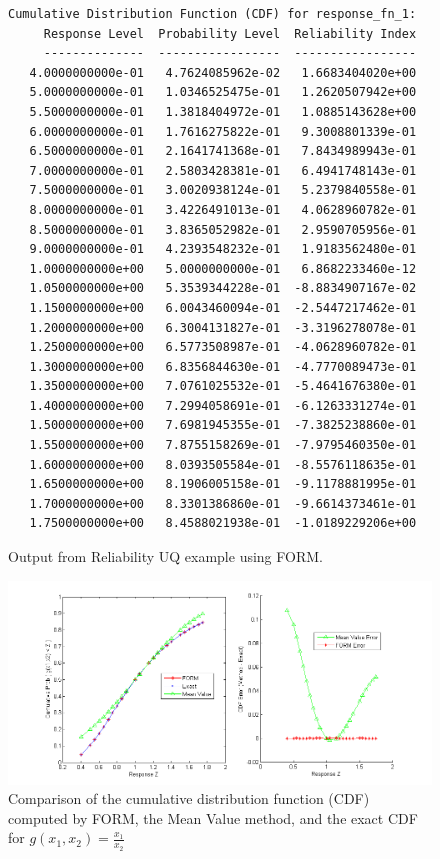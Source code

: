 \begin{figure}
\centering
\begin{bigbox}
\begin{small}
\begin{verbatim}
Cumulative Distribution Function (CDF) for response_fn_1:
     Response Level  Probability Level  Reliability Index
     --------------  -----------------  -----------------
   4.0000000000e-01   4.7624085962e-02   1.6683404020e+00
   5.0000000000e-01   1.0346525475e-01   1.2620507942e+00
   5.5000000000e-01   1.3818404972e-01   1.0885143628e+00
   6.0000000000e-01   1.7616275822e-01   9.3008801339e-01
   6.5000000000e-01   2.1641741368e-01   7.8434989943e-01
   7.0000000000e-01   2.5803428381e-01   6.4941748143e-01
   7.5000000000e-01   3.0020938124e-01   5.2379840558e-01
   8.0000000000e-01   3.4226491013e-01   4.0628960782e-01
   8.5000000000e-01   3.8365052982e-01   2.9590705956e-01
   9.0000000000e-01   4.2393548232e-01   1.9183562480e-01
   1.0000000000e+00   5.0000000000e-01   6.8682233460e-12
   1.0500000000e+00   5.3539344228e-01  -8.8834907167e-02
   1.1500000000e+00   6.0043460094e-01  -2.5447217462e-01
   1.2000000000e+00   6.3004131827e-01  -3.3196278078e-01
   1.2500000000e+00   6.5773508987e-01  -4.0628960782e-01
   1.3000000000e+00   6.8356844630e-01  -4.7770089473e-01
   1.3500000000e+00   7.0761025532e-01  -5.4641676380e-01
   1.4000000000e+00   7.2994058691e-01  -6.1263331274e-01
   1.5000000000e+00   7.6981945355e-01  -7.3825238860e-01
   1.5500000000e+00   7.8755158269e-01  -7.9795460350e-01
   1.6000000000e+00   8.0393505584e-01  -8.5576118635e-01
   1.6500000000e+00   8.1906005158e-01  -9.1178881995e-01
   1.7000000000e+00   8.3301386860e-01  -9.6614373461e-01
   1.7500000000e+00   8.4588021938e-01  -1.0189229206e+00
\end{verbatim}
\end{small}
\end{bigbox}
\caption{Output from Reliability UQ example using FORM.}
\label{uq:rel_output_form}
\end{figure}

\begin{figure}
  \centering
  \includegraphics[scale=0.5]{images/cdf_form}
\caption{Comparison of the cumulative distribution function (CDF) computed by
FORM, the Mean Value method, and the exact CDF for $g(x_1,x_2)=\frac{x_1}{x_2}$}
\label{uq:rel_form_compare}
\end{figure}


